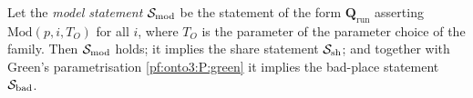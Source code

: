 \begin{proposition}\label{pf:onto3:share}
Let the \emph{model statement} $\mathcal{S}_{\mathrm{mod}}$ be the statement of the form $\mathbf Q_{\mathrm{run}}$ asserting
$\mathrm{Mod}(p,i,T_O)$ for all $i$, where $T_O$ is the parameter of the parameter choice of the family. Then
$\mathcal{S}_{\mathrm{mod}}$ holds; it implies the share statement $\mathcal{S}_{\mathrm{sh}}$; and together with Green's
parametrisation \ref{pf:onto3:P:green} it implies the bad-place statement $\mathcal{S}_{\mathrm{bad}}$.
\end{proposition}

